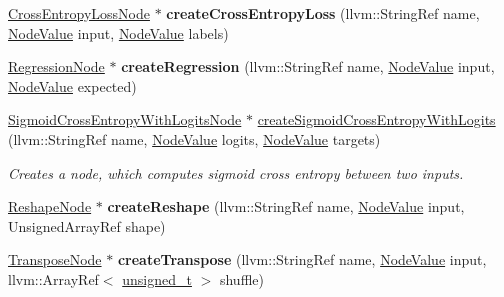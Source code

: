 \begin{DoxyCompactItemize}
\mbox{\label{classglow_1_1_function_a58a9399b85f89421ef812a7b05f16966}} 
\hyperlink{classglow_1_1_cross_entropy_loss_node}{Cross\+Entropy\+Loss\+Node} $\ast$ {\bfseries create\+Cross\+Entropy\+Loss} (llvm\+::\+String\+Ref name, \hyperlink{structglow_1_1_node_value}{Node\+Value} input, \hyperlink{structglow_1_1_node_value}{Node\+Value} labels)
\item 
\mbox{\label{classglow_1_1_function_ae34682d96ea79254986f7026a0d53398}} 
\hyperlink{classglow_1_1_regression_node}{Regression\+Node} $\ast$ {\bfseries create\+Regression} (llvm\+::\+String\+Ref name, \hyperlink{structglow_1_1_node_value}{Node\+Value} input, \hyperlink{structglow_1_1_node_value}{Node\+Value} expected)
\item 
\mbox{\label{classglow_1_1_function_aba0a2bb490c6973c7986c635c10f3a60}} 
\hyperlink{classglow_1_1_sigmoid_cross_entropy_with_logits_node}{Sigmoid\+Cross\+Entropy\+With\+Logits\+Node} $\ast$ \hyperlink{classglow_1_1_function_aba0a2bb490c6973c7986c635c10f3a60}{create\+Sigmoid\+Cross\+Entropy\+With\+Logits} (llvm\+::\+String\+Ref name, \hyperlink{structglow_1_1_node_value}{Node\+Value} logits, \hyperlink{structglow_1_1_node_value}{Node\+Value} targets)
\begin{DoxyCompactList}\small\item\em Creates a node, which computes sigmoid cross entropy between two inputs. \end{DoxyCompactList}\item 
\mbox{\label{classglow_1_1_function_a5761ec0e5f1d4ef24a00ed2b8e97e1b2}} 
\hyperlink{classglow_1_1_reshape_node}{Reshape\+Node} $\ast$ {\bfseries create\+Reshape} (llvm\+::\+String\+Ref name, \hyperlink{structglow_1_1_node_value}{Node\+Value} input, Unsigned\+Array\+Ref shape)
\item 
\mbox{\label{classglow_1_1_function_a95baf74375150ab5f302ff9996278bf2}} 
\hyperlink{classglow_1_1_transpose_node}{Transpose\+Node} $\ast$ {\bfseries create\+Transpose} (llvm\+::\+String\+Ref name, \hyperlink{structglow_1_1_node_value}{Node\+Value} input, llvm\+::\+Array\+Ref$<$ \hyperlink{namespaceglow_a0ca574644e1e42ef193a9947fb4d8911}{unsigned\+\_\+t} $>$ shuffle)
\item 

\end{DoxyCompactItemize}
